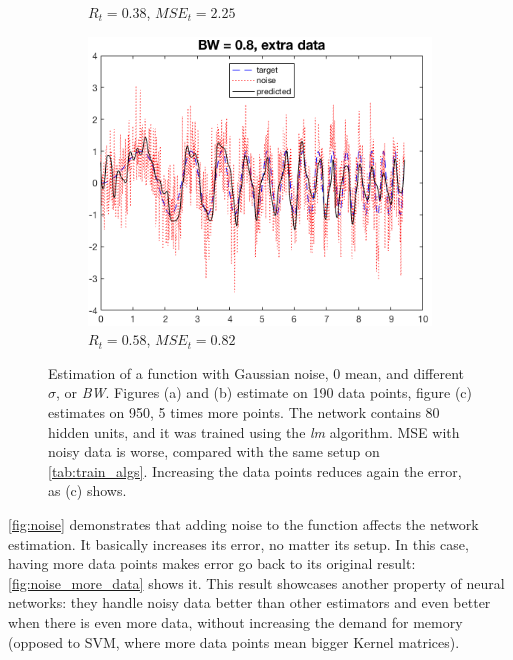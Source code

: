 \documentclass[a4paper, 10pt]{article}
\begin{document}
\begin{figure}[h]
\begin{adjustwidth}{-1.1cm}{-1.1cm}
\begin{subfigure}[t]{0.30\linewidth}
        \caption{$R_t=0.38$, $MSE_t=2.25$}
        \label{fig:noise_big}
      \end{subfigure}
      \begin{subfigure}[t]{0.3\linewidth}
        \includegraphics[width=1\linewidth]{./lab1/noise_8e-1_extra.png}
        \caption{$R_t=0.58$, $MSE_t=0.82$}
        \label{fig:noise_more_data}
      \end{subfigure}
      \end{adjustwidth}
      \caption{Estimation of a function with Gaussian noise, 0 mean, and different
        $\sigma$, or \emph{BW}. Figures (a) and (b) estimate on 190 data points, 
        figure (c) estimates on 950, 5 times more points. The network contains 80 
        hidden units, and it was trained using the \emph{lm} algorithm. MSE 
        with noisy data is worse, compared with the same setup on 
        \autoref{tab:train_algs}. Increasing the data points reduces again the 
        error, as (c) shows.}
      \label{fig:noise}
    \end{figure}

    \autoref{fig:noise} demonstrates that adding noise to the function affects
    the network estimation. It basically increases its error, no matter its
    setup. In this case, having more data points makes error go back to its
    original result: \autoref{fig:noise_more_data} shows it. This result 
    showcases another property of neural networks: they handle noisy data better
    than other estimators and even better when there is even more data, without
    increasing the demand for memory (opposed to SVM, where more data points mean
    bigger Kernel matrices).
      
\end{document}
